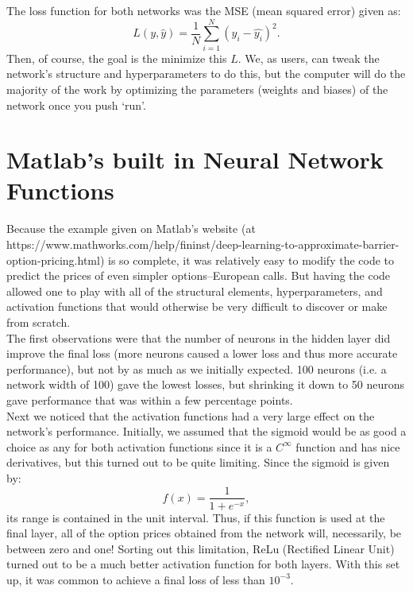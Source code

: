 \documentclass[reqno,14pt]{amsart}
\theoremstyle{plain}
\theoremstyle{definition}
\theoremstyle{remark}
\begin{document}
The loss function for both networks was the MSE (mean squared error) given as:
\begin{equation}
    L(y,\hat{y}) = \frac{1}{N} \sum_{i=1}^N (y_i - \hat{y_i})^2.
\end{equation}
Then, of course, the goal is the minimize this $L$. We, as users, can tweak the network's structure and hyperparameters to do this, but the computer will do the majority of the work by optimizing the parameters (weights and biases) of the network once you push `run'. \\


\section{Matlab's built in Neural Network Functions}
Because the example given on Matlab's website (at https://www.mathworks.com/help/fininst/deep-learning-to-approximate-barrier-option-pricing.html) is so complete, it was relatively easy to modify the code to predict the prices of even simpler options--European calls. But having the code allowed one to play with all of the structural elements, hyperparameters, and activation functions that would otherwise be very difficult to discover or make from scratch.\\
The first observations were that the number of neurons in the hidden layer did improve the final loss (more neurons caused a lower loss and thus more accurate performance), but not by as much as we initially expected. 100 neurons (i.e. a network width of 100) gave the lowest losses, but shrinking it down to 50 neurons gave performance that was within a few percentage points.\\
Next we noticed that the activation functions had a very large effect on the network's performance. Initially, we assumed that the sigmoid would be as good a choice as any for both activation functions since it is a $C^\infty$ function and has nice derivatives, but this turned out to be quite limiting. Since the sigmoid is given by:
\begin{equation}
    f(x) = \frac{1}{1+e^{-x}},
\end{equation}
its range is contained in the unit interval. Thus, if this function is used at the final layer, all of the option prices obtained from the network will, necessarily, be between zero and one! Sorting out this limitation, ReLu (Rectified Linear Unit) turned out to be a much better activation function for both layers. With this set up, it was common to achieve a final loss of less than $10^{-3}$.\\
\end{document}
